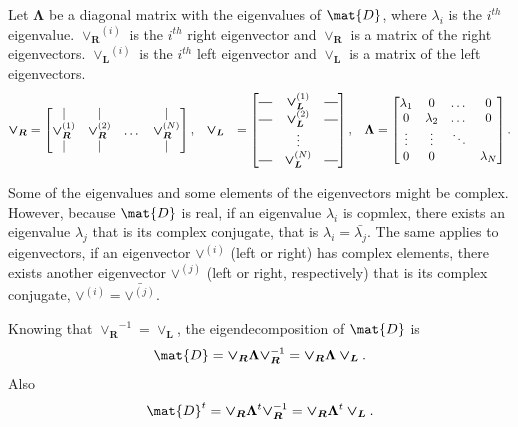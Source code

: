\documentclass[12pt]{report}
\newcommand*{\horz}{\rule[.5ex]{2.5ex}{0.5pt}}
\newcommand*\conj[1]{\bar{#1}}
\begin{document}
Let $\bm{\Lambda}$ be a diagonal matrix with the eigenvalues of $\mat{D}$, where
$\lambda_i$ is the $i^{th}$ eigenvalue. $\bm{\vee_R}^{(i)}$ is the $i^{th}$
right eigenvector and $\bm{\vee_R}$ is a matrix of the right
eigenvectors. $\bm{\vee_L}^{(i)}$ is the $i^{th}$ left eigenvector and
$\bm{\vee_L}$ is a matrix of the left eigenvectors.
\begin{align}
  \bm{\vee_R} &= \begin{bmatrix}
    \vert           & \vert           &       & \vert \\
    \bm{\vee_R}^{(1)} & \bm{\vee_R}^{(2)} & \dots & \bm{\vee_R}^{(N)} \\
    \vert           & \vert           &       & \vert \end{bmatrix}, &&
  \bm{\vee_L} &= \begin{bmatrix}
      \horz   & \bm{\vee_L}^{(1)} & \horz \\
      \horz   & \bm{\vee_L}^{(2)} & \horz \\
              & \vdots            &       \\
      \horz   & \bm{\vee_L}^{(N)} & \horz \end{bmatrix}, &&
  \bm{\Lambda} = \begin{bmatrix}
    \lambda_1 & 0 		      & \dots  & 0 \\
    0 	 	    & \lambda_2   & \dots  & 0 \\
    \vdots 	  & \vdots	    & \ddots &   \\
    0	        & 0           &        & \lambda_N
  \end{bmatrix}.
\end{align}

Some of the eigenvalues and some elements of the eigenvectors might be complex.
However, because $\mat{D}$ is real, if an eigenvalue $\lambda_i$ is copmlex,
there exists an eigenvalue $\lambda_j$ that is its complex conjugate, that is
$\lambda_i = \conj{\lambda_j}$. The same applies to eigenvectors, if an
eigenvector $\bm{\vee}^{(i)}$ (left or right) has complex elements, there exists
another eigenvector $\bm{\vee}^{(j)}$ (left or right, respectively) that is its
complex conjugate, $\bm{\vee}^{(i)} = \conj{\bm{\vee}^{(j)}}$.

Knowing that $\bm{\vee_R}^{-1} = \bm{\vee_L}$, the eigendecomposition of
$\mat{D}$ is
\begin{equation}
  \mat{D} = \bm{\vee_R} \bm{\Lambda} \bm{\vee_R}^{-1}
          = \bm{\vee_R} \bm{\Lambda} \bm{\vee_L}.
\end{equation}
Also
\begin{equation}
  \mat{D}^t = \bm{\vee_R} \bm{\Lambda}^t \bm{\vee_R}^{-1}
            = \bm{\vee_R} \bm{\Lambda}^t \bm{\vee_L}.
\end{equation}
\end{document}
